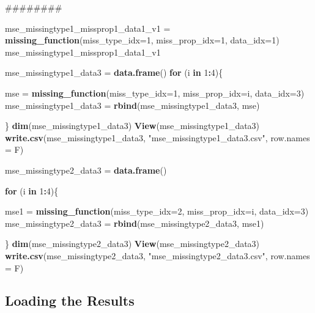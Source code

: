 \documentclass[]{article}
\newenvironment{Shaded}{\begin{snugshade}}{\end{snugshade}}
\newcommand{\KeywordTok}[1]{\textcolor[rgb]{0.13,0.29,0.53}{\textbf{#1}}}
\newcommand{\DataTypeTok}[1]{\textcolor[rgb]{0.13,0.29,0.53}{#1}}
\newcommand{\DecValTok}[1]{\textcolor[rgb]{0.00,0.00,0.81}{#1}}
\newcommand{\StringTok}[1]{\textcolor[rgb]{0.31,0.60,0.02}{#1}}
\newcommand{\ControlFlowTok}[1]{\textcolor[rgb]{0.13,0.29,0.53}{\textbf{#1}}}
\newcommand{\OperatorTok}[1]{\textcolor[rgb]{0.81,0.36,0.00}{\textbf{#1}}}
\newcommand{\NormalTok}[1]{#1}
\begin{document}
\begin{Shaded}
\begin{Highlighting}[]
\NormalTok{########}

\NormalTok{mse_missingtype1_missprop1_data1_v1 =}\StringTok{ }\KeywordTok{missing_function}\NormalTok{(}\DataTypeTok{miss_type_idx=}\DecValTok{1}\NormalTok{, }\DataTypeTok{miss_prop_idx=}\DecValTok{1}\NormalTok{, }\DataTypeTok{data_idx=}\DecValTok{1}\NormalTok{)}
\NormalTok{mse_missingtype1_missprop1_data1_v1}

\NormalTok{mse_missingtype1_data3 =}\StringTok{ }\KeywordTok{data.frame}\NormalTok{()}
\ControlFlowTok{for}\NormalTok{ (i }\ControlFlowTok{in} \DecValTok{1}\OperatorTok{:}\DecValTok{4}\NormalTok{)\{}
  
\NormalTok{  mse =}\StringTok{ }\KeywordTok{missing_function}\NormalTok{(}\DataTypeTok{miss_type_idx=}\DecValTok{1}\NormalTok{, }\DataTypeTok{miss_prop_idx=}\NormalTok{i, }\DataTypeTok{data_idx=}\DecValTok{3}\NormalTok{)}
\NormalTok{  mse_missingtype1_data3 =}\StringTok{ }\KeywordTok{rbind}\NormalTok{(mse_missingtype1_data3, mse)}
  
\NormalTok{\}}
\KeywordTok{dim}\NormalTok{(mse_missingtype1_data3)}
\KeywordTok{View}\NormalTok{(mse_missingtype1_data3)}
\KeywordTok{write.csv}\NormalTok{(mse_missingtype1_data3, }\StringTok{"mse_missingtype1_data3.csv"}\NormalTok{, }\DataTypeTok{row.names =}\NormalTok{ F)}

\NormalTok{mse_missingtype2_data3 =}\StringTok{ }\KeywordTok{data.frame}\NormalTok{()}

\ControlFlowTok{for}\NormalTok{ (i }\ControlFlowTok{in} \DecValTok{1}\OperatorTok{:}\DecValTok{4}\NormalTok{)\{}
  
\NormalTok{  mse1 =}\StringTok{ }\KeywordTok{missing_function}\NormalTok{(}\DataTypeTok{miss_type_idx=}\DecValTok{2}\NormalTok{, }\DataTypeTok{miss_prop_idx=}\NormalTok{i, }\DataTypeTok{data_idx=}\DecValTok{3}\NormalTok{)}
\NormalTok{  mse_missingtype2_data3 =}\StringTok{ }\KeywordTok{rbind}\NormalTok{(mse_missingtype2_data3, mse1)}
  
\NormalTok{\}}
\KeywordTok{dim}\NormalTok{(mse_missingtype2_data3)}
\KeywordTok{View}\NormalTok{(mse_missingtype2_data3)}
\KeywordTok{write.csv}\NormalTok{(mse_missingtype2_data3, }\StringTok{"mse_missingtype2_data3.csv"}\NormalTok{, }\DataTypeTok{row.names =}\NormalTok{ F)}
\end{Highlighting}
\end{Shaded}

\subsection{Loading the Results}\label{loading-the-results}
\end{document}
